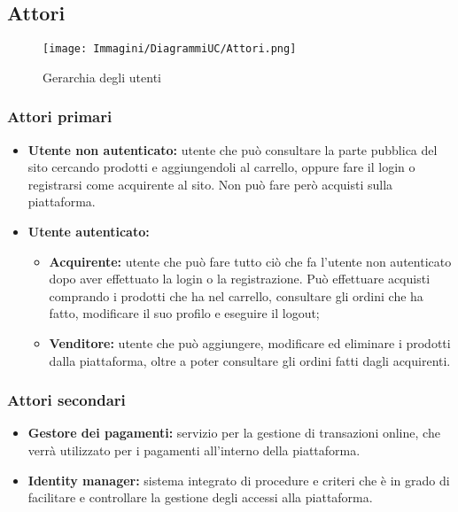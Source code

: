 \subsection{Attori} \label{Attori}

\begin{figure}[ht]
    \centering
    \texttt{[image: Immagini/DiagrammiUC/Attori.png]}
    \caption{Gerarchia degli utenti} 
    \label{fig:attori}
\end{figure}

\subsubsection{Attori primari}
\begin{itemize}
    \item \textbf{Utente non autenticato:} utente che può consultare la parte pubblica del sito cercando prodotti e aggiungendoli al carrello, oppure fare il login o registrarsi come acquirente al sito. Non può fare però acquisti sulla piattaforma.
    \item \textbf{Utente autenticato:}
    \begin{itemize}
        \item \textbf{Acquirente:} utente che può fare tutto ciò che fa l'utente non autenticato dopo aver effettuato la login o la registrazione. Può effettuare acquisti comprando i prodotti che ha nel carrello, consultare gli ordini che ha fatto, modificare il suo profilo e eseguire il logout;
        \item \textbf{Venditore:} utente che può aggiungere, modificare ed eliminare i prodotti dalla piattaforma, oltre a poter consultare gli ordini fatti dagli acquirenti.
    \end{itemize}
\end{itemize}
\subsubsection{Attori secondari}
\begin{itemize}
\item \textbf{Gestore dei pagamenti:} servizio per la gestione di transazioni online, che verrà utilizzato per i pagamenti all'interno della piattaforma.%
\item \textbf{Identity manager:} sistema integrato di procedure e criteri che è in grado di facilitare e controllare la gestione degli accessi alla piattaforma. 
\end{itemize}
